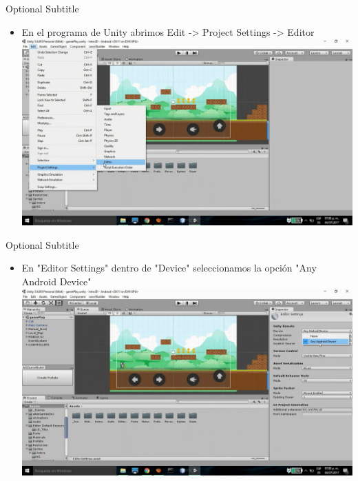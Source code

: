 \documentclass{beamer}
\begin{document}
\begin{frame}{03}{Optional Subtitle}
  \begin{itemize}
  \item {
    En el programa de Unity abrimos
    Edit -> Project Settings -> Editor
  }
  \includegraphics[width=\linewidth]{image2/UR03}
  \end{itemize}
\end{frame}

\begin{frame}{04}{Optional Subtitle}
  \begin{itemize}
  \item {
    En "Editor Settings" dentro de "Device" seleccionamos la opción "Any Android Device"
  }
  \includegraphics[width=\linewidth]{image2/UR04}
  \end{itemize}
\end{frame}
\end{document}
